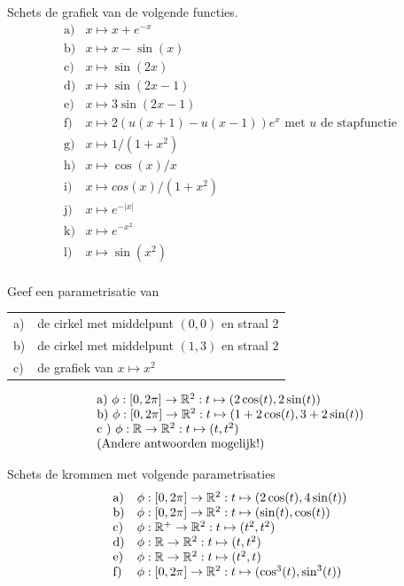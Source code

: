 \begin{oefening2}
Schets de grafiek van de volgende functies.
\[
\begin{array}{ll}
\mbox{a)} & x\mapsto x+e^{-x}\\
\mbox{b)} & x\mapsto x-\sin(x)\\
\mbox{c)} & x\mapsto \sin(2x)\\
\mbox{d)} & x\mapsto \sin(2x-1)\\
\mbox{e)} & x\mapsto 3\sin(2x-1)\\
\mbox{f)} & x\mapsto 2(u(x+1)-u(x-1))e^x \mbox{ met $u$ de
  stapfunctie}\\
\mbox{g)} & x\mapsto 1/(1+x^2)\\
\mbox{h)} & x\mapsto \cos(x)/x\\
\mbox{i)} & x\mapsto cos(x)/(1+x^2)\\
\mbox{j)} & x\mapsto e^{-|x|}\\
\mbox{k)} & x\mapsto e^{-x^2}\\
\mbox{l)} & x\mapsto \sin(x^2)\\
\end{array}
\]
\end{oefening2}

\begin{oefening2}
Geef een parametrisatie van\\
\begin{tabular}{ll}
a) & de cirkel met middelpunt $(0,0)$ en straal $2$\\
b) & de cirkel met middelpunt $(1,3)$ en straal $2$\\
c) & de grafiek van $x\mapsto x^2$
\end{tabular}

\begin{opl}
\[
\ba{l}
\mbox{a)~} \phi: [0,2\pi] \rightarrow \R^2: t\mapsto
(2\cos(t),2\sin(t))\\
\mbox{b)~} \phi: [0,2\pi] \rightarrow \R^2: t\mapsto
(1+2\cos(t),3+2\sin(t))\\
\mbox{c~)~} \phi: \R \rightarrow \R^2: t\mapsto
(t,t^2)\\
\mbox{(Andere antwoorden mogelijk!)}
\ea
\]
\end{opl}

\end{oefening2}

\begin{oefening2}
Schets de krommen met volgende parametrisaties
\[
\begin{array}{ll}
\mbox{a)} & \phi: [0,2\pi] \rightarrow \R^2: t\mapsto (2\cos(t),4\sin(t))\\
\mbox{b)} & \phi: [0,2\pi] \rightarrow \R^2: t\mapsto (\sin(t),\cos(t))\\
\mbox{c)} & \phi: \R^+ \rightarrow \R^2: t\mapsto (t^2,t^2)\\
\mbox{d)} & \phi: \R \rightarrow \R^2: t\mapsto (t,t^2)\\
\mbox{e)} & \phi: \R \rightarrow \R^2: t\mapsto (t^2,t)\\
\mbox{f)} & \phi: [0,2\pi] \rightarrow \R^2: t\mapsto (\cos^3(t),\sin^3(t))\\
\end{array}
\]
\end{oefening2}

